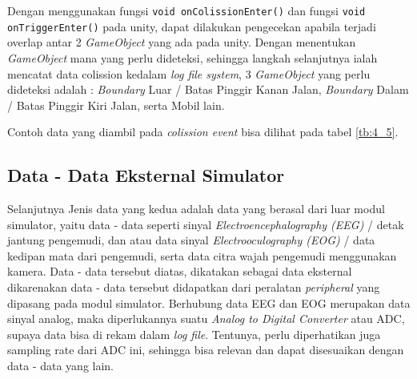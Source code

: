          \par Dengan menggunakan fungsi \texttt{void onColissionEnter()} dan fungsi \texttt{void onTriggerEnter()} pada unity, dapat dilakukan pengecekan apabila terjadi overlap antar 2 \textit{GameObject} yang ada pada unity. Dengan menentukan \textit{GameObject} mana yang perlu dideteksi, sehingga langkah selanjutnya ialah mencatat data colission kedalam \textit{log file system}, 3 \textit{GameObject} yang perlu dideteksi adalah : \textit{Boundary} Luar / Batas Pinggir Kanan Jalan, \textit{Boundary} Dalam / Batas Pinggir Kiri Jalan, serta Mobil lain.
         
         \par Contoh data yang diambil pada \textit{colission event} bisa dilihat pada tabel \ref{tb:4_5}.
        
    
    \subsection{Data - Data Eksternal Simulator}
    \vspace{1ex}
    
     Selanjutnya Jenis data yang kedua adalah data yang berasal dari luar modul simulator, yaitu data - data seperti sinyal \textit{Electroencephalography (EEG)} / detak jantung pengemudi, dan atau data sinyal \textit{Electrooculography (EOG)} / data kedipan mata dari pengemudi, serta data citra wajah pengemudi menggunakan kamera. Data - data tersebut diatas, dikatakan sebagai data eksternal dikarenakan data - data tersebut didapatkan dari peralatan \textit{peripheral} yang dipasang pada modul simulator. Berhubung data EEG dan EOG merupakan data sinyal analog, maka diperlukannya suatu \textit{Analog to Digital Converter} atau ADC, supaya data bisa di rekam dalam \textit{log file}.
     Tentunya, perlu diperhatikan juga sampling rate dari ADC ini, sehingga bisa relevan dan dapat disesuaikan dengan data - data yang lain.
     
